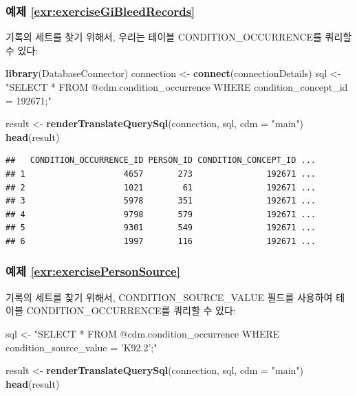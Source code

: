 \documentclass[11pt]{book}
\newenvironment{Shaded}{\begin{snugshade}}{\end{snugshade}}
\newcommand{\KeywordTok}[1]{\textcolor[rgb]{0.13,0.29,0.53}{\textbf{#1}}}
\newcommand{\DataTypeTok}[1]{\textcolor[rgb]{0.13,0.29,0.53}{#1}}
\newcommand{\StringTok}[1]{\textcolor[rgb]{0.31,0.60,0.02}{#1}}
\newcommand{\NormalTok}[1]{#1}
\theoremstyle{definition}
\theoremstyle{definition}
\theoremstyle{definition}
\theoremstyle{remark}
\begin{document}
\subsubsection*{예제
\ref{exr:exerciseGiBleedRecords}}\label{-refexrexercisegibleedrecords}

기록의 세트를 찾기 위해서, 우리는 테이블 CONDITION\_OCCURRENCE를 쿼리할
수 있다:

\begin{Shaded}
\begin{Highlighting}[]
\KeywordTok{library}\NormalTok{(DatabaseConnector)}
\NormalTok{connection <-}\StringTok{ }\KeywordTok{connect}\NormalTok{(connectionDetails)}
\NormalTok{sql <-}\StringTok{ "SELECT *}
\StringTok{FROM @cdm.condition_occurrence}
\StringTok{WHERE condition_concept_id = 192671;"}

\NormalTok{result <-}\StringTok{ }\KeywordTok{renderTranslateQuerySql}\NormalTok{(connection, sql, }\DataTypeTok{cdm =} \StringTok{"main"}\NormalTok{)}
\KeywordTok{head}\NormalTok{(result)}
\end{Highlighting}
\end{Shaded}

\begin{verbatim}
##   CONDITION_OCCURRENCE_ID PERSON_ID CONDITION_CONCEPT_ID ...
## 1                    4657       273               192671 ...
## 2                    1021        61               192671 ...
## 3                    5978       351               192671 ...
## 4                    9798       579               192671 ...
## 5                    9301       549               192671 ...
## 6                    1997       116               192671 ...
\end{verbatim}

\subsubsection*{예제
\ref{exr:exercisePersonSource}}\label{-refexrexercisepersonsource}

기록의 세트를 찾기 위해서, CONDITION\_SOURCE\_VALUE 필드를 사용하여
테이블 CONDITION\_OCCURRENCE를 쿼리할 수 있다:

\begin{Shaded}
\begin{Highlighting}[]
\NormalTok{sql <-}\StringTok{ "SELECT *}
\StringTok{FROM @cdm.condition_occurrence}
\StringTok{WHERE condition_source_value = 'K92.2';"}

\NormalTok{result <-}\StringTok{ }\KeywordTok{renderTranslateQuerySql}\NormalTok{(connection, sql, }\DataTypeTok{cdm =} \StringTok{"main"}\NormalTok{)}
\KeywordTok{head}\NormalTok{(result)}
\end{Highlighting}
\end{Shaded}
\end{document}
